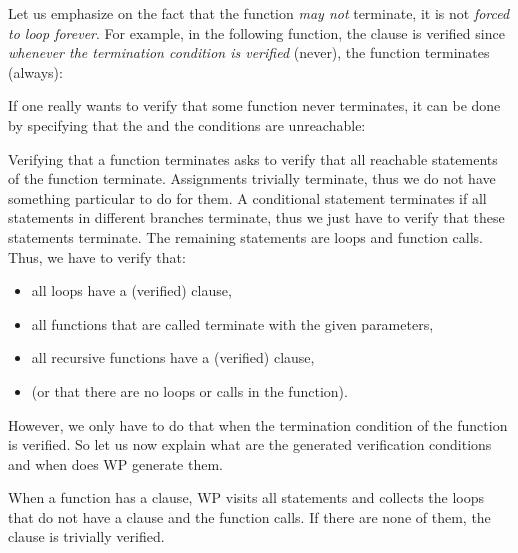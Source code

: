 


Let us emphasize on the fact that the function {\em may not} terminate, it is
not {\em forced to loop forever}. For example, in the following function, the
 clause is verified since
{\em whenever the termination condition is verified} (never), the function
terminates (always):






\begin{Information}
  If one really wants to verify that some function never terminates, it can be
  done by specifying that the  and the 
  conditions are unreachable:
\end{Information}






Verifying that a function terminates asks to verify that all reachable
statements of the function terminate. Assignments trivially terminate, thus
we do not have something particular to do for them. A conditional statement
terminates if all statements in different branches terminate, thus we just
have to verify that these statements terminate. The remaining statements are
loops and function calls. Thus, we have to verify that:



\begin{itemize}
  \item all loops have a (verified)  clause,
  \item all functions that are called terminate with the given parameters,
  \item all recursive functions have a (verified)  clause,
  \item (or that there are no loops or calls in the function).
\end{itemize}



However, we only have to do that when the termination condition of the function
is verified. So let us now explain what are the generated verification
conditions and when does WP generate them.



When a function has a  clause, WP visits all statements
and collects the loops that do not have a  clause and
the function calls. If there are none of them, the 
clause is trivially verified.



